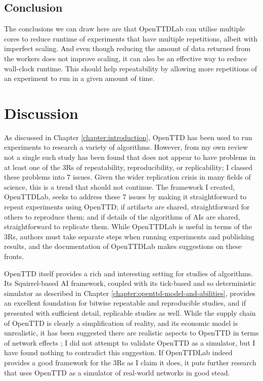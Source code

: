\documentclass[logo,msc,dsti]{style/infthesis}    %
\begin{document}
{\section{Conclusion}

The conclusions we can draw here are that OpenTTDLab can utilise multiple cores to reduce runtime of experiments that have multiple repetitions, albeit with imperfect scaling. And even though reducing the amount of data returned from the workers does not improve scaling, it can also be an effective way to reduce wall-clock runtime. This should help repeatability by allowing more repetitions of an experiment to run in a given amount of time.

\chapter{Discussion}
\label{chapter:discussion}

As discussed in Chapter \ref{chapter:introduction}, OpenTTD has been used to run experiments to research a variety of algorithms. However, from my own review not a single such study has been found that does not appear to have problems in at least one of the 3Rs of repeatability, reproducibility, or replicability; I classed these problems into 7 issues. Given the wider replication crisis in many fields of science, this is a trend that should not continue. The framework I created, OpenTTDLab, seeks to address these 7 issues by making it straightforward to repeat experiments using OpenTTD; if artifacts are shared, straightforward for others to reproduce them; and if details of the algorithms of AIs are shared, straightforward to replicate them. While OpenTTDLab is useful in terms of the 3Rs, authors must take separate steps when running experiments and publishing results, and the documentation of OpenTTDLab makes suggestions on these fronts.

OpenTTD itself provides a rich and interesting setting for studies of algorithms. Its Squirrel-based AI framework, coupled with its tick-based and so deterministic simulator as described in Chapter \ref{chapter:openttd-model-and-abilities}, provides an excellent foundation for bitwise repeatable and reproducible studies, and if presented with sufficient detail, replicable studies as well. While the supply chain of OpenTTD is clearly a simplification of reality, and its economic model is unrealistic, it has been suggested there are realistic aspects to OpenTTD in terms of network effects \cite{raghothama2013review}; I did not attempt to validate OpenTTD as a simulator, but I have found nothing to contradict this suggestion. If OpenTTDLab indeed provides a good framework for the 3Rs as I claim it does, it puts further research that uses OpenTTD as a simulator of real-world networks in good stead.

}
\end{document}
